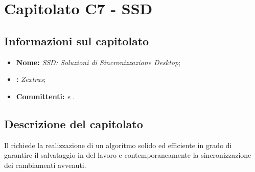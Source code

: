 \section{Capitolato C7 - SSD}\label{C7}
\subsection{Informazioni sul capitolato}
\begin{itemize}
	\item \textbf{Nome:} \textit{SSD: Soluzioni di Sincronizzazione Desktop};
	\item \textbf{:} \textit{Zextras};
	\item \textbf{Committenti:} \textit{\VT{} e \CR{}}.
\end{itemize}

\subsection{Descrizione del capitolato}
Il  richiede la realizzazione di un algoritmo solido ed efficiente in grado di garantire il salvataggio in  del lavoro e contemporaneamente la sincronizzazione dei cambiamenti avvenuti.

